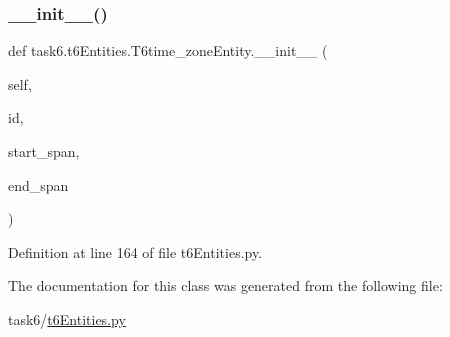 \subsubsection{\texorpdfstring{\+\_\+\+\_\+init\+\_\+\+\_\+()}{\_\_init\_\_()}}
{\footnotesize\ttfamily def task6.\+t6\+Entities.\+T6time\+\_\+zone\+Entity.\+\_\+\+\_\+init\+\_\+\+\_\+ (\begin{DoxyParamCaption}\item[{}]{self,  }\item[{}]{id,  }\item[{}]{start\+\_\+span,  }\item[{}]{end\+\_\+span }\end{DoxyParamCaption})}



Definition at line 164 of file t6\+Entities.\+py.



The documentation for this class was generated from the following file\+:\begin{DoxyCompactItemize}
\item 
task6/\hyperlink{t6Entities_8py}{t6\+Entities.\+py}\end{DoxyCompactItemize}
